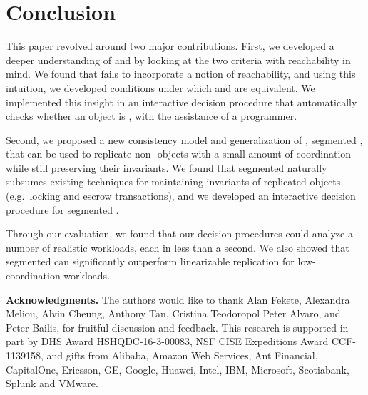 \section{Conclusion}
This paper revolved around two major contributions.
%
First, we developed a deeper understanding of \invariantclosure{} and
\invariantconfluence{} by looking at the two criteria with reachability in
mind. We found that \invariantclosure{} fails to incorporate a notion of
reachability, and using this intuition, we developed conditions under which
\invariantclosure{} and \invariantconfluence{} are equivalent. We implemented
this insight in an interactive \invariantconfluence{} decision procedure
that automatically checks whether an object is \invariantconfluent{}, with the
assistance of a programmer.

Second, we proposed a new consistency model and generalization of
\invariantconfluence{}, segmented \invariantconfluence{}, that can be used to
replicate non-\invariantconfluent{} objects with a small amount of coordination
while still preserving their invariants. We found that segmented
\invariantconfluence{} naturally subsumes existing techniques for maintaining
invariants of replicated objects (e.g.\ locking and escrow transactions), and
we developed an interactive decision procedure for segmented
\invariantconfluence{}.

Through our evaluation, we found that our decision procedures could analyze a
number of realistic workloads, each in less than a second. We also showed that
segmented \invariantconfluence{} can significantly outperform linearizable
replication for low-coordination workloads.

\textbf{Acknowledgments.}
The authors would like to thank Alan Fekete, Alexandra Meliou, Alvin Cheung,
Anthony Tan, Cristina Teodoropol Peter Alvaro, and Peter Bailis, for fruitful
discussion and feedback.
%
This research is supported in part by DHS Award HSHQDC-16-3-00083, NSF CISE
Expeditions Award CCF-1139158, and gifts from Alibaba, Amazon Web Services, Ant
Financial, CapitalOne, Ericsson, GE, Google, Huawei, Intel, IBM, Microsoft,
Scotiabank, Splunk and VMware.
